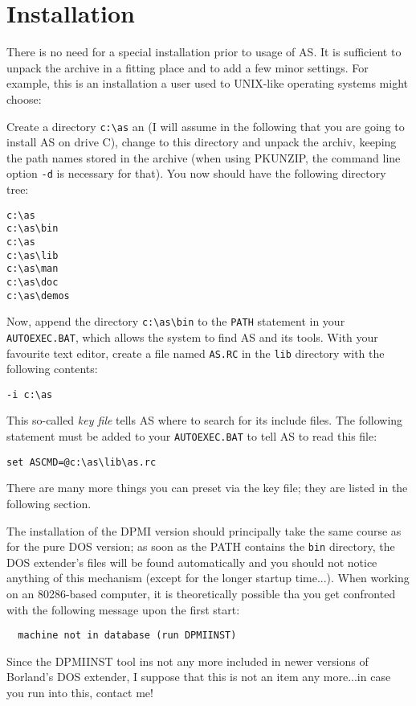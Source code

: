 \documentclass[12pt,twoside]{report}
\newcommand{\tty}[1]{{\tt #1}}
\newcommand{\asname}{{AS}}
\begin{document}

\section{Installation}

There is no need for a  special installation prior to
usage of \asname{}.  It is sufficient to unpack the archive in a fitting place
and to add a few minor settings.  For example, this is an installation a
user used to UNIX-like operating systems might choose:

Create a directory \verb!c:\as! an (I will assume in the following that
you are going to install \asname{} on drive C), change to this directory and
unpack the archiv, keeping the path names stored in the archive (when
using PKUNZIP, the command line option \verb!-d! is necessary for that).
You now should have the following directory tree:
\begin{verbatim}
c:\as
c:\as\bin
c:\as
c:\as\lib
c:\as\man
c:\as\doc
c:\as\demos
\end{verbatim}
Now, append the directory \verb!c:\as\bin! to the \tty{PATH} statement in
your \tty{AUTOEXEC.BAT}, which allows the system to find \asname{} and its tools.
With your favourite text editor, create a file named \tty{AS.RC} in the
\tty{lib} directory with the following contents:
\begin{verbatim}
-i c:\as
\end{verbatim}
This so-called {\em key file} tells \asname{} where to search for its include
files.  The following statement must be added to your \tty{AUTOEXEC.BAT}
to tell \asname{} to read this file:
\begin{verbatim}
set ASCMD=@c:\as\lib\as.rc
\end{verbatim}
There are many more things you can preset via the key file; they are
listed in the following section.

The installation of the DPMI version  should
principally take the same course as for the pure DOS version; as soon as
the PATH contains the {\tt bin} directory, the DOS extender's files will
be found automatically and you should not notice anything of this
mechanism (except for the longer startup time...).  When working on an
80286-based computer, it is theoretically possible tha you get confronted
with the following message upon the first start:
\begin{verbatim}
  machine not in database (run DPMIINST)
\end{verbatim}
Since the DPMIINST tool ins not any more included in newer versions of
Borland's DOS extender, I suppose that this is not an item any more...in
case you run into this, contact me!
\end{document}
